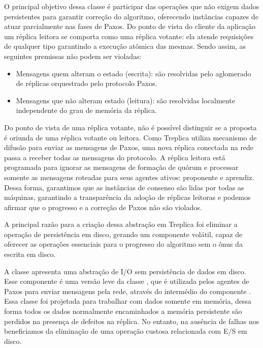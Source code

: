 O principal objetivo dessa classe é participar das operações que não exigem dados
persistentes para garantir correção do algoritmo, oferecendo instâncias capazes de atuar
parcialmente nas fases de Paxos. Do ponto de vista do cliente da aplicação um réplica
leitora se comporta como uma réplica votante: ela atende requisições de qualquer tipo
garantindo a execução atômica das mesmas. Sendo assim, as seguintes premissas não podem
ser violadas:

\begin{itemize}
  \item Mensagens quem alteram o estado (escrita): são resolvidas pelo aglomerado de
    réplicas orquestrado pelo protocolo Paxos.
  \item Mensagens que não alteram estado (leitura): são resolvidas localmente independente
    do grau de memória da réplica.
\end{itemize}

Do ponto de vista de uma réplica votante, não é possível distinguir se a proposta é
oriunda de uma réplica votante ou leitora. Como Treplica utiliza mecanismo de difusão para
enviar as mensagens de Paxos, uma nova réplica conectada na rede passa a receber todas as
mensagens do protocolo. A réplica leitora está programada para ignorar as mensagens de
formação de quórum e processar somente as mensagens roteadas para seus agentes ativos:
proponente e aprendiz. Dessa forma, garantimos que as instâncias de consenso são lidas por
todas as máquinas, garantindo a transparência da adoção de réplicas leitoras e podemos
afirmar que o progresso e a correção de Paxos não são violados.

A principal razão para a criação dessa abstração em Treplica foi eliminar a operação de
persistência em disco, gerando um componente volátil, capaz de oferecer as operações
essenciais para o progresso do algoritmo sem o ônus da escrita em disco.


A classe  apresenta uma abstração de I/O sem persistência de
dados em disco. Esse componente é uma versão leve da classe , que é
utilizada pelos agentes de Paxos para enviar mensagens pela rede, através do intermédio do
componente . Essa classe foi projetada para trabalhar com dados
somente em memória, dessa forma todos os dados normalmente encaminhados a memória
persistente são perdidos na presença de defeitos na réplica. No entanto, na ausência de
falhas nos beneficiamos da eliminação de uma operação custosa relacionada com E/S em
disco.


